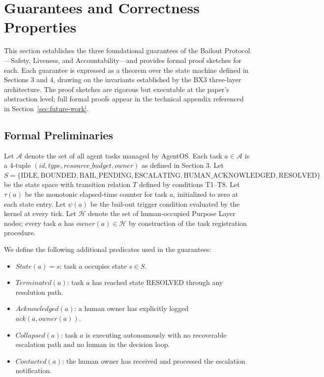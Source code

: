 \section{Guarantees and Correctness Properties}
\label{sec:guarantees}

This section establishes the three foundational guarantees of the Bailout Protocol—Safety, Liveness, and Accountability—and provides formal proof sketches for each. Each guarantee is expressed as a theorem over the state machine defined in Sections 3 and 4, drawing on the invariants established by the BX3 three-layer architecture. The proof sketches are rigorous but executable at the paper's abstraction level; full formal proofs appear in the technical appendix referenced in Section~\ref{sec:future-work}.

\subsection{Formal Preliminaries}

Let $\mathcal{A}$ denote the set of all agent tasks managed by AgentOS. Each task $a \in \mathcal{A}$ is a 4-tuple $(id, type, resource\_budget, owner)$ as defined in Section 3. Let $S = \{\text{IDLE}, \text{BOUNDED}, \text{BAIL\_PENDING}, \text{ESCALATING}, \text{HUMAN\_ACKNOWLEDGED}, \text{RESOLVED}\}$ be the state space with transition relation $T$ defined by conditions T1–T8. Let $\tau(a)$ be the monotonic elapsed-time counter for task $a$, initialized to zero at each state entry. Let $\psi(a)$ be the bail-out trigger condition evaluated by the kernel at every tick. Let $\mathcal{H}$ denote the set of human-occupied Purpose Layer nodes; every task $a$ has $owner(a) \in \mathcal{H}$ by construction of the task registration procedure.

We define the following additional predicates used in the guarantees:

\begin{itemize}
\item $State(a) = s$: task $a$ occupies state $s \in S$.
\item $Terminated(a)$: task $a$ has reached state RESOLVED through any resolution path.
\item $Acknowledged(a)$: a human owner has explicitly logged $ack(a, owner(a))$.
\item $Collapsed(a)$: task $a$ is executing autonomously with no recoverable escalation path and no human in the decision loop.
\item $Contacted(a)$: the human owner has received and processed the escalation notification.
\end{itemize}

